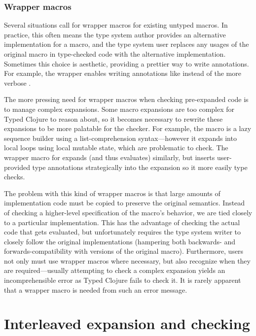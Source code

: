 \subsection{Wrapper macros}

Several situations call for wrapper macros for existing untyped macros.
In practice, this often means the type system author provides an alternative
implementation for a macro, and the type system user
replaces any usages of the original macro in type-checked code with the alternative implementation.
Sometimes this choice is aesthetic, providing a prettier 
way to write annotations. For example, the  wrapper
enables writing annotations like
instead of the more verbose
.

The more pressing need for wrapper macros when checking pre-expanded
code is to manage complex expansions.
Some macro expansions are too complex for Typed Clojure to reason about,
so it becomes necessary to rewrite these expansions to be more palatable
for the checker.
For example, the  macro is a lazy sequence builder using
a list-comprehension syntax---however it expands into local
loops using local mutable state, which are problematic to check.
The wrapper macro for  expands (and thus evaluates) similarly, but inserts user-provided
type annotations strategically into the expansion so it more easily type checks.

The problem with this kind of wrapper macros is that large amounts
of implementation code must be copied to preserve the original semantics.
Instead of checking a higher-level specification of the macro's behavior,
we are tied closely to a particular implementation.
This has the advantage of checking the actual code that gets evaluated, but
unfortunately
requires the type system writer to closely follow the original implementations
(hampering both backwards- and forwards-compatibility with versions of the original macro).
Furthermore, users not only must use wrapper macros where necessary, but
also recognize when they are required---usually attempting to check a complex
expansion yields an incomprehensible error as Typed Clojure fails to check it.
It is rarely apparent that a wrapper macro is needed from such an error message.

\chapter{Interleaved expansion and checking}

